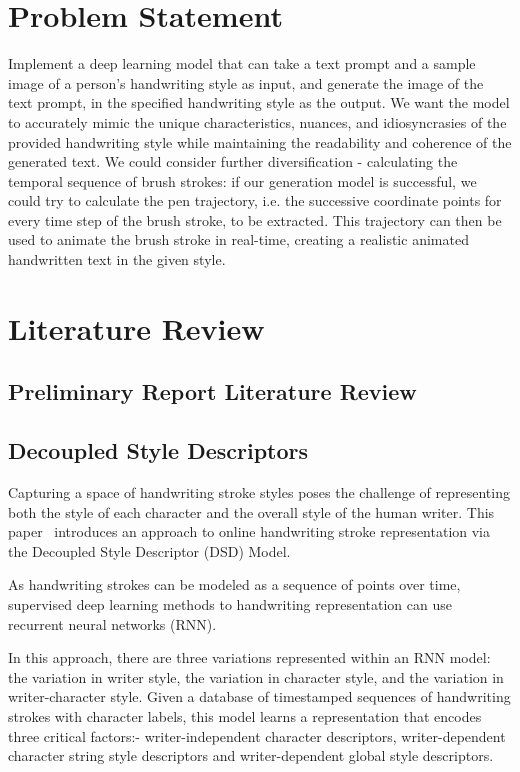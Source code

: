 \documentclass[10pt,twocolumn,letterpaper]{article}
\begin{document}
\section{Problem Statement}
\label{sec: PS}
Implement a deep learning model that can take a text prompt and a sample image of a person's handwriting style as input, and generate the image of the text prompt, in the specified handwriting style as the output. We want the model to accurately mimic the unique characteristics, nuances, and idiosyncrasies of the provided handwriting style while maintaining the readability and coherence of the generated text. We could consider further diversification - calculating the temporal sequence of brush strokes: if our generation model is successful, we could try to calculate the pen trajectory, i.e. the successive coordinate points for every time step of the brush stroke, to be extracted. This trajectory can then be used to animate the brush stroke in real-time, creating a realistic animated handwritten text in the given style.  


\section{Literature Review}
\label{sec: Lit Rev}
\subsection*{Preliminary Report Literature Review}

\subsection{Decoupled Style Descriptors\cite{BRUSH-paper}} 
\label{subsec: Brush Paper}
 Capturing a space of handwriting stroke styles poses the challenge of representing both the style of each character and the overall style of the human writer.
This paper~\cite{BRUSH-paper} introduces an approach to online handwriting stroke representation via the Decoupled Style Descriptor (DSD) Model. 

As handwriting strokes can be modeled as  a sequence of points over time, supervised deep learning methods to handwriting representation can use recurrent neural networks (RNN).

In this approach, there are three variations represented within an RNN model: the variation in writer style, the variation in character style, and the variation in writer-character style. Given a database of timestamped sequences of handwriting strokes with character labels, this model learns a representation that encodes three critical factors:- writer-independent character descriptors, writer-dependent character string style descriptors and writer-dependent global style descriptors.
\end{document}
